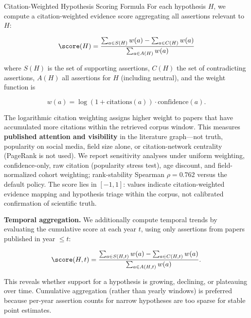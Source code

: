 \documentclass[
  ignorenonframetext,
]{beamer}
\begin{document}
\begin{frame}{Citation-Weighted Hypothesis
Scoring Formula \label{sec:appendix_scoring}}
\protect{}\label{citation-weighted-hypothesis-scoring-formula}
For each hypothesis \(H\), we compute a citation-weighted evidence score
aggregating all assertions relevant to \(H\):

\begin{equation}
\score(H) = \frac{\sum_{a \in S(H)} w(a) - \sum_{a \in C(H)} w(a)}{\sum_{a \in A(H)} w(a)} \label{eq:app_score}
\end{equation}

where \(S(H)\) is the set of supporting assertions, \(C(H)\) the set of
contradicting assertions, \(A(H)\) all assertions for \(H\) (including
neutral), and the weight function is

\begin{equation}
w(a) = \log(1 + \text{citations}(a)) \cdot \text{confidence}(a). \label{eq:app_weight}
\end{equation}

The logarithmic citation weighting assigns higher weight to papers that
have accumulated more citations within the retrieved corpus window. This
measures \textbf{published attention and visibility} in the literature
graph---not truth, popularity on social media, field size alone, or
citation-network centrality (PageRank is not used). We report
sensitivity analyses under uniform weighting, confidence-only, raw
citation (popularity stress test), age discount, and field-normalized
cohort weighting; rank-stability Spearman \(\rho = 0.762\) versus the
default policy. The score lies in \([-1, 1]\): values indicate
citation-weighted evidence mapping and hypothesis triage within the
corpus, not calibrated confirmation of scientific truth.

\textbf{Temporal aggregation.} We additionally compute temporal trends
by evaluating the cumulative score at each year \(t\), using only
assertions from papers published in year \(\leq t\):

\begin{equation}
\score(H, t) = \frac{\sum_{a \in S(H,t)} w(a) - \sum_{a \in C(H,t)} w(a)}{\sum_{a \in A(H,t)} w(a)}. \label{eq:app_score_t}
\end{equation}

This reveals whether support for a hypothesis is growing, declining, or
plateauing over time. Cumulative aggregation (rather than yearly
windows) is preferred because per-year assertion counts for narrow
hypotheses are too sparse for stable point estimates.


\end{frame}
\end{document}
